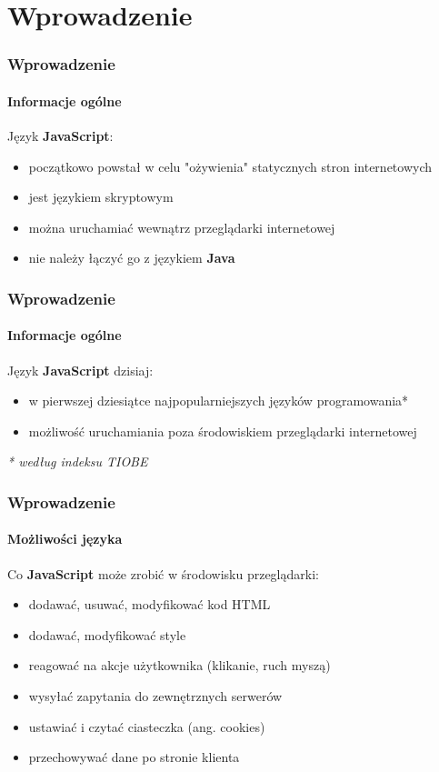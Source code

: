 \section{Wprowadzenie}


\begin{frame}[fragile]
  \frametitle{Wprowadzenie}
  \framesubtitle{Informacje ogólne}

  Język \textbf{JavaScript}:
  \begin{itemize}
    \item początkowo powstał w celu "ożywienia" statycznych stron internetowych
    \item jest językiem skryptowym
    \item można uruchamiać wewnątrz przeglądarki internetowej
    \item nie należy łączyć go z językiem \textbf{Java}
  \end{itemize}
\end{frame}


\begin{frame}[fragile]
  \frametitle{Wprowadzenie}
  \framesubtitle{Informacje ogólne}

  Język \textbf{JavaScript} dzisiaj:
  \begin{itemize}
    \item w pierwszej dziesiątce najpopularniejszych języków programowania*
    \item możliwość uruchamiania poza środowiskiem przeglądarki internetowej
  \end{itemize}

  \textit{* według indeksu TIOBE}
\end{frame}


\begin{frame}[fragile]
  \frametitle{Wprowadzenie}
  \framesubtitle{Możliwości języka}

  Co \textbf{JavaScript} może zrobić w środowisku przeglądarki:
  \begin{itemize}
    \item dodawać, usuwać, modyfikować kod HTML
    \item dodawać, modyfikować style
    \item reagować na akcje użytkownika (klikanie, ruch myszą)
    \item wysyłać zapytania do zewnętrznych serwerów
    \item ustawiać i czytać ciasteczka (ang. cookies)
    \item przechowywać dane po stronie klienta
  \end{itemize}
\end{frame}


